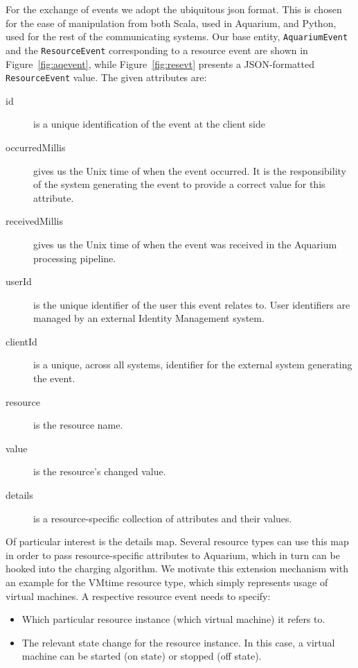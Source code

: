 \documentclass[preprint,10pt]{sigplanconf}
\begin{document}
For the exchange of events we adopt the ubiquitous {\sc json} format. This is chosen for the ease of manipulation from both Scala, used in Aquarium, and Python, used for the rest of the communicating systems. Our base entity, \texttt{AquariumEvent} and the \texttt{ResourceEvent} corresponding to a resource event are shown in Figure~\ref{fig:aqevent}, while Figure~\ref{fig:resevt} presents a JSON-formatted \texttt{ResourceEvent} value. The given attributes are:

\begin{description}

\item[id] is a unique identification of the event at the client side

\item[occurredMillis] gives us the Unix time of when the event occurred. It is the responsibility of the system generating the event to provide a correct value for this attribute.

\item[receivedMillis] gives us the Unix time of when the event was received in the Aquarium processing pipeline.

\item[userId] is the unique identifier of the user this event relates to. User identifiers are managed by an external Identity Management system.

\item[clientId] is a unique, across all systems, identifier for the external system generating the event.

\item[resource] is the resource name.

\item[value] is the resource's changed value.

\item[details] is a resource-specific collection of  attributes and their values.
\end{description}

Of particular interest is the \textsf{details} map. Several resource types can use this map in order to pass resource-specific attributes to Aquarium, which in turn can be hooked into the charging algorithm. We motivate this extension mechanism with an example for the \textsf{VMtime} resource type, which simply represents usage of virtual machines. A respective resource event needs to specify:
\begin{itemize}
\item Which particular resource instance (which virtual machine) it refers to.
\item The relevant state change for the resource instance. In this case, a virtual machine can be started (\textsf{on} state) or stopped (\textsf{off} state).
\end{itemize}
\end{document}
